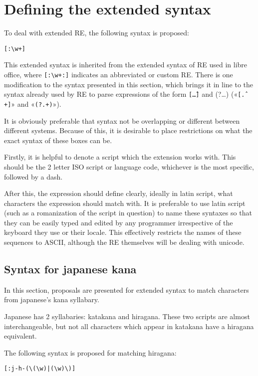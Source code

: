 \documentclass{article}
\begin{document}
\section{Defining the extended syntax}

To deal with extended RE, the following syntax is proposed:

\texttt{[:\textbackslash w+]}

This extended syntax is inherited from the extended syntax of RE used in libre
office, where \texttt{[:\textbackslash w+:]} indicates an abbreviated or custom RE. There is
one modification to the syntax presented in this section, which brings it in
line to the syntax already used by RE to parse expressions of the form
\texttt{[\^\dots]} and (?\dots) («\texttt{[\^.+]}» and «\texttt{(?.+)}»).

It is obviously preferable that syntax not be overlapping or different between
different systems. Because of this, it is desirable to place restrictions on
what the exact syntax of these boxes can be.

Firstly, it is helpful to denote a script which the extension works with. This
should be the 2 letter ISO script or language code, whichever is the most
specific, followed by a dash.

After this, the expression should define clearly, ideally in latin script, what
characters the expression should match with. It is preferable to use latin
script (such as a romanization of the script in question) to name these syntaxes
so that they can be easily typed and edited by any programmer irrespective of
the keyboard they use or their locale. This effectively restricts the names of
these sequences to ASCII, although the RE themselves will be dealing with
unicode.

\subsection{Syntax for japanese kana}

In this section, proposals are presented for extended syntax to match characters
from japanese's kana syllabary.

Japanese has 2 syllabaries: katakana and hiragana. These two scripts are almost
interchangeable, but not all characters which appear in katakana have a hiragana
equivalent.

The following syntax is proposed for matching hiragana:

\texttt{[:j-h-(\textbackslash *(\textbackslash w)|(\textbackslash w)\textbackslash *)]}
\end{document}
